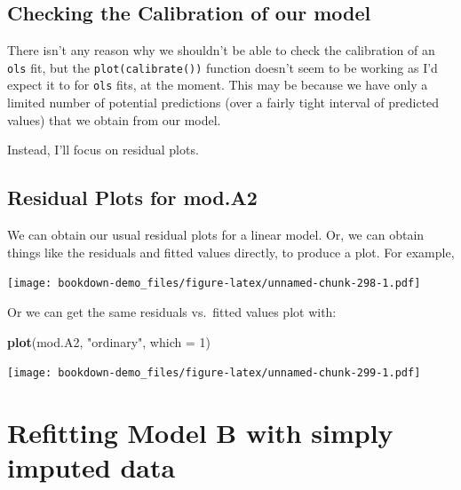 \documentclass[]{book}
\newenvironment{Shaded}{\begin{snugshade}}{\end{snugshade}}
\newcommand{\KeywordTok}[1]{\textcolor[rgb]{0.13,0.29,0.53}{\textbf{#1}}}
\newcommand{\DataTypeTok}[1]{\textcolor[rgb]{0.13,0.29,0.53}{#1}}
\newcommand{\DecValTok}[1]{\textcolor[rgb]{0.00,0.00,0.81}{#1}}
\newcommand{\StringTok}[1]{\textcolor[rgb]{0.31,0.60,0.02}{#1}}
\newcommand{\OperatorTok}[1]{\textcolor[rgb]{0.81,0.36,0.00}{\textbf{#1}}}
\newcommand{\NormalTok}[1]{#1}
\theoremstyle{definition}
\theoremstyle{definition}
\theoremstyle{definition}
\theoremstyle{remark}
\begin{document}
\subsection{Checking the Calibration of our
model}\label{checking-the-calibration-of-our-model-2}

There isn't any reason why we shouldn't be able to check the calibration
of an \texttt{ols} fit, but the \texttt{plot(calibrate())} function
doesn't seem to be working as I'd expect it to for \texttt{ols} fits, at
the moment. This may be because we have only a limited number of
potential predictions (over a fairly tight interval of predicted values)
that we obtain from our model.

Instead, I'll focus on residual plots.

\subsection{Residual Plots for mod.A2}\label{residual-plots-for-mod.a2}

We can obtain our usual residual plots for a linear model. Or, we can
obtain things like the residuals and fitted values directly, to produce
a plot. For example,

\begin{Shaded}
\end{Shaded}

\texttt{[image: bookdown-demo\_files/figure-latex/unnamed-chunk-298-1.pdf]}

Or we can get the same residuals vs.~fitted values plot with:

\begin{Shaded}
\begin{Highlighting}[]
\KeywordTok{plot}\NormalTok{(mod.A2, }\StringTok{"ordinary"}\NormalTok{, }\DataTypeTok{which =} \DecValTok{1}\NormalTok{)}
\end{Highlighting}
\end{Shaded}

\texttt{[image: bookdown-demo\_files/figure-latex/unnamed-chunk-299-1.pdf]}

\section{Refitting Model B with simply imputed
data}\label{refitting-model-b-with-simply-imputed-data}
\end{document}
